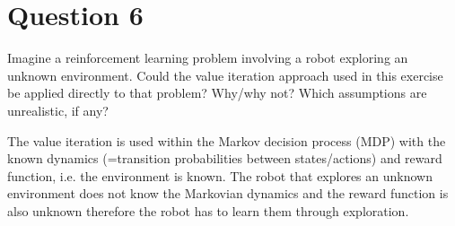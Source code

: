 \documentclass[12pt]{article}
\begin{document}
\pagebreak


\section*{Question 6}

Imagine a reinforcement learning problem involving a robot exploring an unknown environment. 
Could the value iteration approach used in this exercise be applied directly to that problem? 
Why/why not? Which assumptions are unrealistic, if any?
\newline

The value iteration is used within the Markov decision process (MDP) with the known dynamics (=transition probabilities between states/actions) and reward function, i.e. the environment is known. The robot that explores an unknown environment does not know the Markovian dynamics and the reward function is also unknown therefore the robot has to learn them through exploration. 



\end{document}
